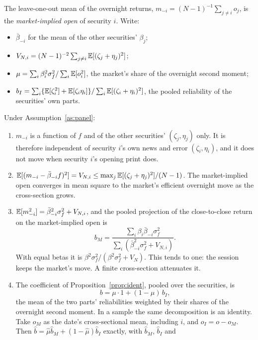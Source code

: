 The leave-one-out mean of the overnight returns, $m_{-i}=(N-1)^{-1}\sum_{j\ne i}o_j$, is the
\emph{market-implied open} of security $i$. Write:
\begin{itemize}
  \item $\bar\beta_{-i}$ for the mean of the other securities' $\beta_j$;
  \item $V_{N,i}=(N-1)^{-2}\sum_{j\ne i}\mathbb{E}[(\zeta_j+\eta_j)^2]$;
  \item $\mu=\sum_i\beta_i^2\sigma_f^2/\sum_i\mathbb{E}[o_i^2]$, the market's share of the overnight second
        moment;
  \item $b_I=\sum_i\{\mathbb{E}[\zeta_i^2]+\mathbb{E}[\zeta_i\eta_i]\}/\sum_i\mathbb{E}[(\zeta_i+\eta_i)^2]$, the pooled
        reliability of the securities' own parts.
\end{itemize}

\begin{proposition}\label{prop:market}
Under Assumption~\ref{as:panel}:
\begin{enumerate}[label=(\alph*)]
  \item $m_{-i}$ is a function of $f$ and of the other securities' $(\zeta_j,\eta_j)$ only. It is
        therefore independent of security $i$'s own news and error $(\zeta_i,\eta_i)$, and it does not
        move when security $i$'s opening print does.
  \item $\mathbb{E}[(m_{-i}-\bar\beta_{-i}f)^2]=V_{N,i}\le\max_j\mathbb{E}[(\zeta_j+\eta_j)^2]/(N-1)$. The
        market-implied open converges in mean square to the market's efficient overnight move as the
        cross-section grows.
  \item $\mathbb{E}[m_{-i}^2]=\bar\beta_{-i}^2\sigma_f^2+V_{N,i}$, and the pooled projection of the
        close-to-close return on the market-implied open is
        \[
          b_M=\frac{\sum_i\beta_i\bar\beta_{-i}\sigma_f^2}{\sum_i(\bar\beta_{-i}^2\sigma_f^2+V_{N,i})}.
        \]
        With equal betas it is $\beta^2\sigma_f^2/(\beta^2\sigma_f^2+V_N)$. This tends to one: the
        session keeps the market's move. A finite cross-section attenuates it.
  \item The coefficient of Proposition~\ref{prop:ident}, pooled over the securities, is
        \[
          b=\mu\cdot1+(1-\mu)\,b_I,
        \]
        the mean of the two parts' reliabilities weighted by their shares of the overnight second
        moment. In a sample the same decomposition is an identity. Take $o_M$ as the date's
        cross-sectional mean, including $i$, and $o_I=o-o_M$. Then
        $\hat b=\hat\mu\hat b_M+(1-\hat\mu)\hat b_I$ exactly, with $\hat b_M$, $\hat b_I$ and

\end{enumerate}
\end{proposition}
